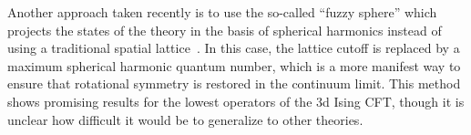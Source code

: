Another approach taken recently is to use the so-called ``fuzzy sphere'' which projects the states of the theory in the basis of spherical harmonics instead of using a traditional spatial lattice~\cite{Zhu2022UncoveringCS,Hu2023OperatorPE}. In this case, the lattice cutoff is replaced by a maximum spherical harmonic quantum number, which is a more manifest way to ensure that rotational symmetry is restored in the continuum limit. This method shows promising results for the lowest operators of the 3d Ising CFT, though it is unclear how difficult it would be to generalize to other theories.
